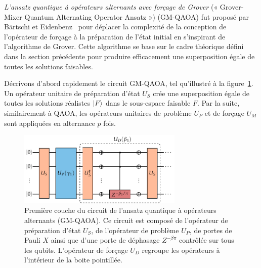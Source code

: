 \textit{L'ansatz quantique à opérateurs alternants avec forçage de Grover} (« Grover-Mixer Quantum Alternating Operator Ansatz ») (GM-QAOA) fut proposé par Bärtschi et Eidenbenz~\cite{bartschiGroverMixersQAOA2020} pour déplacer la complexité de la conception de l'opérateur de forçage à la préparation de l'état initial en s'inspirant de l'algorithme de Grover. Cette algorithme se base sur le cadre théorique défini dans la section précédente pour produire efficacement une superposition égale de toutes les solutions faisables.

Décrivons d'abord rapidement le circuit GM-QAOA, tel qu'illustré à la figure~\ref{fig:gm-qaoa}. Un opérateur unitaire de préparation d'état $U_{S}$ crée une superposition égale de toutes les solutions réalistes $\ket{F}$ dans le sous-espace faisable $F$. Par la suite, similairement à QAOA, les opérateurs unitaires de problème $U_{P}$ et de forçage $U_{M}$ sont appliquées en alternance $p$ fois.

\begin{figure}[ht!]
    \centering
    \includegraphics[width=0.7\textwidth]{figures/gm-qaoa}
    \caption[Circuit de l'ansatz quantique à opérateurs alternants avec forçage de Grover]{Première couche du circuit de l'ansatz quantique à opérateurs alternants (GM-QAOA). Ce circuit est composé de l'opérateur de préparation d'état $U_{S}$, de l'opérateur de problème $U_{P}$, de portes de Pauli $X$ ainsi que d'une porte de déphasage $Z^{-\beta \pi}$ contrôlée sur tous les qubits. L'opérateur de forçage $U_{D}$ regroupe les opérateurs à l'intérieur de la boite pointillée.}
    \label{fig:gm-qaoa}
\end{figure}

